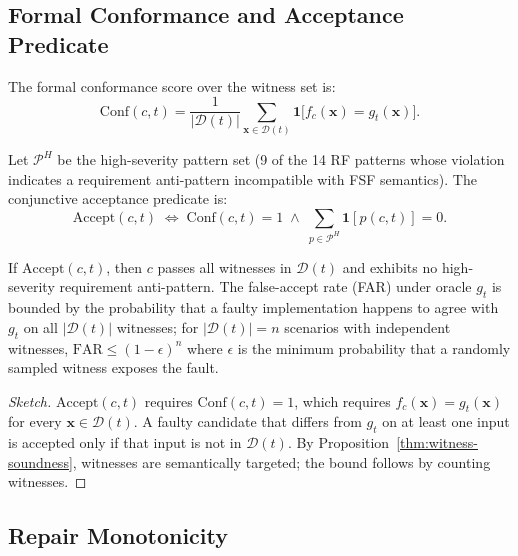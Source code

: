 \subsection{Formal Conformance and Acceptance Predicate}
\label{subsec:conformance-acceptance}

The formal conformance score over the witness set is:
\begin{equation}
  \label{eq:conformance}
  \mathrm{Conf}(c,t) = \frac{1}{|\mathcal{D}(t)|} \sum_{\mathbf{x} \in \mathcal{D}(t)}
  \mathbf{1}\bigl[f_c(\mathbf{x}) = g_t(\mathbf{x})\bigr].
\end{equation}

Let $\mathcal{P}^H$ be the high-severity pattern set (9 of the 14 RF patterns whose
violation indicates a requirement anti-pattern incompatible with FSF semantics).
The conjunctive acceptance predicate is:
\begin{equation}
  \label{eq:accept}
  \mathrm{Accept}(c,t) \;\iff\;
  \mathrm{Conf}(c,t) = 1 \;\land\;
  \sum_{p \in \mathcal{P}^H} \mathbf{1}[p(c,t)] = 0.
\end{equation}

\begin{theorem}
\label{thm:acceptance-safety}
If $\mathrm{Accept}(c,t)$, then $c$ passes all witnesses in $\mathcal{D}(t)$ and
exhibits no high-severity requirement anti-pattern.  The false-accept rate (FAR) under
oracle $g_t$ is bounded by the probability that a faulty implementation happens to agree
with $g_t$ on all $|\mathcal{D}(t)|$ witnesses; for $|\mathcal{D}(t)| = n$ scenarios
with independent witnesses, $\mathrm{FAR} \leq (1-\epsilon)^n$ where $\epsilon$ is the
minimum probability that a randomly sampled witness exposes the fault.
\end{theorem}
\begin{proof}[Sketch]
$\mathrm{Accept}(c,t)$ requires $\mathrm{Conf}(c,t)=1$, which requires $f_c(\mathbf{x})
= g_t(\mathbf{x})$ for every $\mathbf{x} \in \mathcal{D}(t)$.  A faulty candidate that
differs from $g_t$ on at least one input is accepted only if that input is not in
$\mathcal{D}(t)$.  By Proposition~\ref{thm:witness-soundness}, witnesses are semantically
targeted; the bound follows by counting witnesses.
\end{proof}

\subsection{Repair Monotonicity}
\label{subsec:repair-monotonicity}

